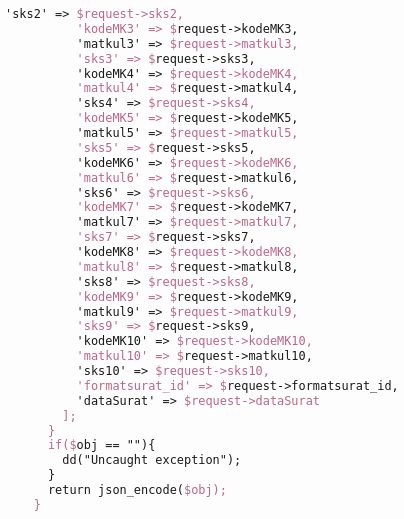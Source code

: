 \begin{lstlisting}[language=tex,basicstyle=\tiny,caption=PesanansuratController.php]
          'sks2' => $request->sks2,
          'kodeMK3' => $request->kodeMK3,
          'matkul3' => $request->matkul3,
          'sks3' => $request->sks3,
          'kodeMK4' => $request->kodeMK4,
          'matkul4' => $request->matkul4,
          'sks4' => $request->sks4,
          'kodeMK5' => $request->kodeMK5,
          'matkul5' => $request->matkul5,
          'sks5' => $request->sks5,
          'kodeMK6' => $request->kodeMK6,
          'matkul6' => $request->matkul6,
          'sks6' => $request->sks6,
          'kodeMK7' => $request->kodeMK7,
          'matkul7' => $request->matkul7,
          'sks7' => $request->sks7,
          'kodeMK8' => $request->kodeMK8,
          'matkul8' => $request->matkul8,
          'sks8' => $request->sks8,
          'kodeMK9' => $request->kodeMK9,
          'matkul9' => $request->matkul9,
          'sks9' => $request->sks9,
          'kodeMK10' => $request->kodeMK10,
          'matkul10' => $request->matkul10,
          'sks10' => $request->sks10,
          'formatsurat_id' => $request->formatsurat_id,
          'dataSurat' => $request->dataSurat
        ];
      }
      if($obj == ""){
        dd("Uncaught exception");
      }
      return json_encode($obj);
    }


\end{lstlisting}
